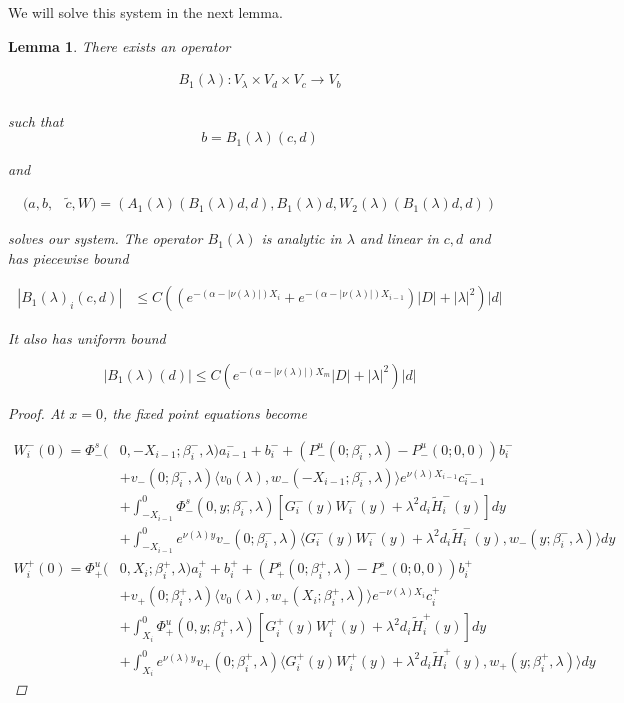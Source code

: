 \documentclass[12pt]{article}
\newtheorem{lemma}{Lemma}
\begin{document}
We will solve this system in the next lemma.


\begin{lemma}\label{inv3}
There exists an operator

\begin{align*}
B_1(\lambda): V_\lambda \times V_d \times V_c \rightarrow V_b \\
\end{align*}

such that 
\[
b = B_1(\lambda)(c, d)
\]

and

\begin{align*}
(a,b,&\tilde{c}, W) 
= (A_1(\lambda)(B_1(\lambda)d, d), B_1(\lambda)d, W_2(\lambda)(B_1(\lambda)d, d))
\end{align*}

solves our system. The operator $B_1(\lambda)$ is analytic in $\lambda$ and linear in $c, d$ and has piecewise bound

\begin{align*}
|B_1(\lambda)_i(c, d)| &\leq C ( (e^{-(\alpha - |\nu(\lambda)|) X_i} + e^{-(\alpha - |\nu(\lambda)|) X_{i-1}} ) |D| + |\lambda|^2 )|d|
\end{align*}

It also has uniform bound

\begin{equation}
|B_1(\lambda)(d)| \leq C ( e^{-(\alpha - |\nu(\lambda)|) X_m} |D| + |\lambda|^2 )|d|
\end{equation}

\begin{proof}

At $x = 0$, the fixed point equations become

\begin{align*}
W_i^-(0) = \Phi^s_-(&0, -X_{i-1}; \beta_i^-, \lambda)a_{i-1}^- + b_i^- + (P^u_-(0; \beta_i^-, \lambda) - P^u_-(0; 0, 0))b_i^- \\
&+ v_-(0; \beta_i^-, \lambda) \langle v_0(\lambda), w_-(-X_{i-1}; \beta_i^-, \lambda) \rangle e^{\nu(\lambda)X_{i-1}} c_{i-1}^- \\
&+ \int_{-X_{i-1}}^0 \Phi^s_-(0, y; \beta_i^-, \lambda) [ G_i^-(y)W_i^-(y) + \lambda^2 d_i \tilde{H}_i^-(y) ] dy \\
&+ \int_{-X_{i-1}}^0
e^{\nu(\lambda)y} v_-(0; \beta_i^-, \lambda) \langle G_i^-(y)W_i^-(y) + \lambda^2 d_i \tilde{H}_i^-(y), w_-(y; \beta_i^-, \lambda) \rangle dy \\
W_i^+(0) = \Phi^u_+(&0, X_i; \beta_i^+, \lambda)a_i^+ + b_i^+ + (P^s_+(0; \beta_i^+, \lambda) - P^s_-(0; 0, 0))b_i^+ \\
&+ v_+(0; \beta_i^+, \lambda) \langle v_0(\lambda), w_+(X_i; \beta_i^+, \lambda) \rangle e^{-\nu(\lambda) X_i} c_i^+ \\
&+ \int_{X_i}^0 \Phi^u_+(0, y; \beta_i^+, \lambda) [ G_i^+(y)W_i^+(y) + \lambda^2 d_i \tilde{H}_i^+(y) ] dy \\
&+ \int_{X_i}^0 e^{\nu(\lambda)y} v_+(0; \beta_i^+, \lambda) \langle G_i^+(y)W_i^+(y) + \lambda^2 d_i \tilde{H}_i^+(y), w_+(y; \beta_i^+, \lambda) \rangle dy
\end{align*}


\end{proof}
\end{lemma}
\end{document}
